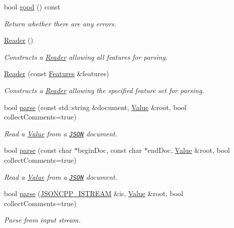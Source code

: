 \begin{DoxyCompactItemize}
bool \hyperlink{class_json_1_1_reader_a86cbb42b3e6d4a4d6416473b1a8f6ae7}{good} () const
\begin{DoxyCompactList}\small\item\em Return whether there are any errors. \end{DoxyCompactList}\item 
\hyperlink{class_json_1_1_reader_a0b3c4e24c8393354bab57a6ba3ffc27f}{Reader} ()
\begin{DoxyCompactList}\small\item\em Constructs a \hyperlink{class_json_1_1_reader}{Reader} allowing all features for parsing. \end{DoxyCompactList}\item 
\hyperlink{class_json_1_1_reader_a45f17831118337309180313e93ac33f8}{Reader} (const \hyperlink{class_json_1_1_features}{Features} \&features)
\begin{DoxyCompactList}\small\item\em Constructs a \hyperlink{class_json_1_1_reader}{Reader} allowing the specified feature set for parsing. \end{DoxyCompactList}\item 
bool \hyperlink{class_json_1_1_reader_af1da6c976ad1e96c742804c3853eef94}{parse} (const std\+::string \&document, \hyperlink{class_json_1_1_value}{Value} \&root, bool collect\+Comments=true)
\begin{DoxyCompactList}\small\item\em Read a \hyperlink{class_json_1_1_value}{Value} from a \href{http://www.json.org}{\tt J\+S\+ON} document. \end{DoxyCompactList}\item 
bool \hyperlink{class_json_1_1_reader_ac71ef2b64c7c27b062052e692af3fb32}{parse} (const char $\ast$begin\+Doc, const char $\ast$end\+Doc, \hyperlink{class_json_1_1_value}{Value} \&root, bool collect\+Comments=true)
\begin{DoxyCompactList}\small\item\em Read a \hyperlink{class_json_1_1_value}{Value} from a \href{http://www.json.org}{\tt J\+S\+ON} document. \end{DoxyCompactList}\item 
bool \hyperlink{class_json_1_1_reader_a6d5d0e23f68749d2f17feece4ccf504d}{parse} (\hyperlink{config_8h_a15f2f70b2ce0a2abd0f8112393dbc4de}{J\+S\+O\+N\+C\+P\+P\+\_\+\+I\+S\+T\+R\+E\+AM} \&is, \hyperlink{class_json_1_1_value}{Value} \&root, bool collect\+Comments=true)
\begin{DoxyCompactList}\small\item\em Parse from input stream. \end{DoxyCompactList}\item 

\end{DoxyCompactItemize}
